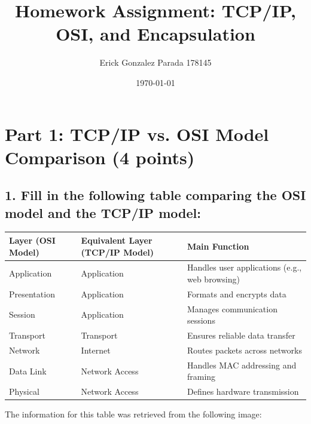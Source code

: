 \documentclass{article}
\begin{document}
\title{Homework Assignment: TCP/IP, OSI, and Encapsulation}
\author{Erick Gonzalez Parada 178145}
\date{\today}

\maketitle

\section*{Part 1: TCP/IP vs. OSI Model Comparison (4 points)}

\subsection*{1. Fill in the following table comparing the OSI model and the TCP/IP model:}

\begin{table}[H]
\centering
\begin{tabularx}{\textwidth}{|l|l|X|}
\hline
\textbf{Layer (OSI Model)} & \textbf{Equivalent Layer (TCP/IP Model)} & \textbf{Main Function} \\
\hline
Application & Application & Handles user applications (e.g., web browsing) \\
\hline
Presentation & Application & Formats and encrypts data \cite{gfg1} \\
\hline
Session & Application & Manages communication sessions \cite{gfg1} \\
\hline
Transport & Transport & Ensures reliable data transfer \cite{gfg2} \\
\hline
Network & Internet & Routes packets across networks \cite{gfg2} \\
\hline
Data Link & Network Access & Handles MAC addressing and framing \cite{fcc} \\
\hline
Physical & Network Access & Defines hardware transmission \cite{fcc} \\
\hline
\end{tabularx}
\end{table}

The information for this table was retrieved from the following image:
\end{document}

